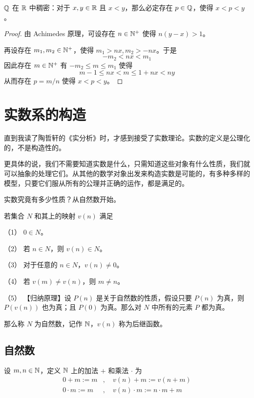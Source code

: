 \begin{example}
	$\mathbb{Q}$ 在 $\mathbb{R}$ 中稠密：对于 $x,y \in \mathbb{R}$ 且 $x<y$，那么必定存在 $p\in\mathbb{Q}$，使得 $x<p<y$。
\end{example}
\begin{proof}
	由 Achimedes 原理，可设存在 $n\in \mathbb{N}^+$ 使得 $n(y-x)>1$。
	
	再设存在 $m_1,m_2\in \mathbb{N}^+$，使得 $m_1>nx,m_2>-nx$。于是
	$$-m_2<nx<m_1$$
	因此存在 $m\in \mathbb{N}^+$ 有 $-m_2\leqslant m \leqslant m_1$ 使得
	$$m-1\leqslant nx < m \leqslant 1+nx < ny$$
	从而存在 $p=m/n$ 使得 $x<p<y$。
\end{proof}


\section{实数系的构造}

直到我读了陶哲轩的《实分析》时，才感到接受了实数理论。实数的定义是公理化的，不是构造性的。

更具体的说，我们不需要知道实数是什么，只需知道这些对象有什么性质，我们就可以抽象的处理它们。从其他的数学对象出发来构造实数是可能的，有多种多样的模型，只要它们服从所有的公理并正确的运作，都是满足的。

实数究竟有多少性质？从自然数开始。

\begin{axiom}[Peano 公理]
	若集合 $N$ 和其上的映射 $v(n)$ 满足

	（1） $0\in N$。

	（2） 若 $n\in N$，则 $v(n) \in N$。

	（3） 对于任意的 $n\in N$，$v(n) \ne 0$。

	（4） 若 $v(m) \ne v(n)$，则 $m\ne n$。

	（5） 【归纳原理】设 $P(n)$ 是关于自然数的性质，假设只要 $P(n)$ 为真，则 $P(v(n))$ 也为真；且 $P(0)$ 为真。那么对 $N$ 中所有的元素 $P$ 都为真。

	那么称 $N$ 为自然数，记作 $\mathbb{N}$，$v(n)$ 称为后继函数。
\end{axiom}

\subsection{自然数}

设 $m,n\in \mathbb{N}$，定义 $\mathbb{N}$ 上的加法 $+$ 和乘法 $\cdot$ 为
\begin{equation*}
	\begin{aligned}
		0+m:=m&,\quad v(n)+m:=v(n+m)\\
		0\cdot m:=m&,\quad v(n)\cdot m:=n \cdot m + m
	\end{aligned}
\end{equation*}

